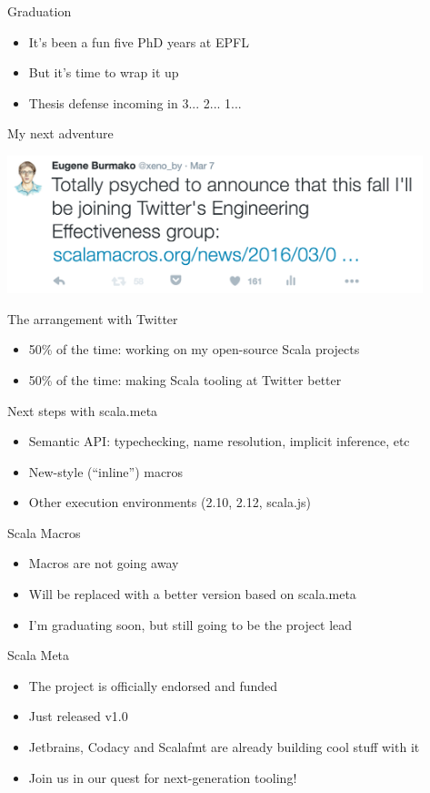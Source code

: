 \documentclass[svgnames,dvipsnames,hyperref={bookmarks=false},usepdftitle=false]{beamer}
\begin{document}

\begin{frame}{Graduation}
\begin{itemize}
\item It's been a fun five PhD years at EPFL
\item But it's time to wrap it up
\item Thesis defense incoming in 3... 2... 1...
\end{itemize}
\end{frame}

\begin{frame}{My next adventure}
\vskip20pt
\begin{center}
\includegraphics[height=4cm]{twitter.png}
\end{center}
\end{frame}

\begin{frame}{The arrangement with Twitter}
\begin{itemize}
\item 50\% of the time: working on my open-source Scala projects
\item 50\% of the time: making Scala tooling at Twitter better
\end{itemize}
\end{frame}

\begin{frame}{Next steps with scala.meta}
\begin{itemize}
\item Semantic API: typechecking, name resolution, implicit inference, etc
\item New-style (``inline'') macros
\item Other execution environments (2.10, 2.12, scala.js)
\end{itemize}
\end{frame}


\begin{frame}{Scala Macros}
\begin{itemize}
\item Macros are not going away
\item Will be replaced with a better version based on scala.meta
\item I'm graduating soon, but still going to be the project lead
\end{itemize}
\end{frame}

\begin{frame}{Scala Meta}
\begin{itemize}
\item The project is officially endorsed and funded
\item Just released v1.0
\item Jetbrains, Codacy and Scalafmt are already building cool stuff with it
\item Join us in our quest for next-generation tooling!
\end{itemize}
\end{frame}
\end{document}
